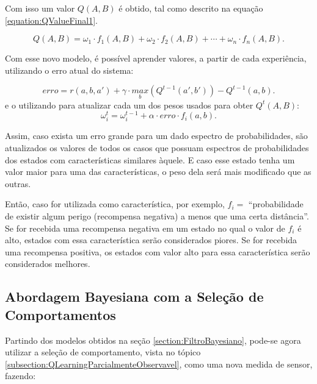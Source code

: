Com isso um valor $ Q \left( A, B \right) $ é obtido, tal como descrito na equação \ref{equation:QValueFinal1}.

\begin{equation} \label{equation:QValueFinal1}
	Q \left( A, B \right) = \omega_1 \cdot f_1 \left( A, B \right) + \omega_2 \cdot f_2 \left( A, B \right) + \cdots + \omega_n \cdot f_n \left( A, B \right).
\end{equation}


Com esse novo modelo, é possível aprender valores, a partir de cada experiência, utilizando o erro atual do sistema:

\begin{equation} \label{equation:ErroQPartiallyObservable}
	erro = r \left( a, b, a' \right) + \gamma \cdot \underset{b}{max} \left( Q^{t-1} \left( a', b' \right) \right) - Q^{t-1} \left( a, b \right).
\end{equation}
e o utilizando para atualizar cada um dos pesos usados para obter $ Q^t \left( A, B \right) $:
\begin{equation} \label{equation:UpdateOmegaQPartiallyObservable}
	\omega_i^t = \omega_i^{t-1} + \alpha \cdot erro \cdot f_i \left( a, b \right).
\end{equation}

Assim, caso exista um erro grande para um dado espectro de probabilidades, são atualizados os valores de todos os casos que possuam espectros de probabilidades dos estados com características similares àquele. E caso esse estado tenha um valor maior para uma das características, o peso dela será mais modificado que as outras.

Então, caso for utilizada como característica, por exemplo, $ f_i = $ ``probabilidade de existir algum perigo (recompensa negativa) a menos que uma certa distância''. Se for recebida uma recompensa negativa em um estado no qual o valor de $ f_i $ é alto, estados com essa característica serão considerados piores. Se for recebida uma recompensa positiva, os estados com valor alto para essa característica serão considerados melhores.


\subsection{Abordagem Bayesiana com a Seleção de Comportamentos} \label{subsection:BayesComSelecaoDeComportamento}

Partindo dos modelos obtidos na seção \ref{section:FiltroBayesiano}, pode-se agora utilizar a seleção de comportamento, vista no tópico \ref{subsection:QLearningParcialmenteObservavel}, como uma nova medida de sensor, fazendo:

